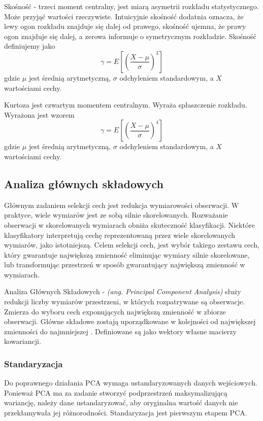\documentclass[a4paper,12pt,twoside,openany]{report}
\newcommand{\ang}[1]{\textit{(ang. #1)}}
\begin{document}
Skośność - trzeci moment centralny, jest miarą asymetrii rozkładu statystycznego. 
Może przyjąć wartości rzeczywiste.
Intuicyjnie skośność dodatnia oznacza, że lewy ogon rozkładu znajduje się dalej od prawego,
skośność ujemna, że prawy ogon znajduje się dalej,
a zerowa informuje o symetrycznym rozkładzie.
Skośność definiujemy jako
\begin{equation}
	\gamma = E \left [ \left (  \frac{X - \mu}{ \sigma }   \right )^3 \right ]
\end{equation}
gdzie $\mu$ jest średnią arytmetyczną, $\sigma$ odchyleniem standardowym, a $X$ wartościami cechy.

Kurtoza jest czwartym momentem centralnym.
Wyraża spłaszczenie rozkładu. 
Wyrażona jest wzorem
\begin{equation}
	\gamma = E \left [ \left (  \frac{X - \mu}{ \sigma }   \right )^4 \right ]
\end{equation}
gdzie $\mu$ jest średnią arytmetyczną, $\sigma$ odchyleniem standardowym, a $X$ wartościami cechy.
\subsection{Analiza głównych składowych}\label{sec:pca}
Głównym zadaniem selekcji cech jest redukcja wymiarowości obserwacji.
W praktyce, wiele wymiarów jest ze sobą silnie skorelowanych.
Rozważanie obserwacji w skorelowanych wymiarach obniża skuteczność klasyfikacji.
Niektóre klasyfikatory interpretują cechę reprezentowaną przez wiele skorelowanych wymiarów, jako istotniejszą.
Celem selekcji cech, jest wybór takiego zestawu cech, który gwarantuje największą zmienność eliminując wymiary silnie skorelowane, 
lub transformując przestrzeń w sposób gwarantujący największą zmienność w wymiarach.

Analiza Głównych Składowych - \ang{Principal Component Analysis} służy redukcji liczby wymiarów przestrzeni,
w których rozpatrywane są obserwacje.
Zmierza do wyboru cech exponujących największą zmienność w zbiorze obserwacji.
Główne składowe zostają uporządkowane w kolejności od największej zmienności do najmniejszej \cite{Bro2014}.
Definiowane są jako wektory własne macierzy kowariancji.

\subsubsection{Standaryzacja}
Do poprawnego działania PCA wymaga ustandaryzowanych danych wejściowych.
Ponieważ PCA ma za zadanie stworzyć podprzestrzeń maksymalizującą wariancję,
należy dane ustandaryzować, aby oryginalna wartość danych nie 
przekłamywała jej różnorodności.
Standaryzacja jest pierwszym etapem PCA.
\end{document}
